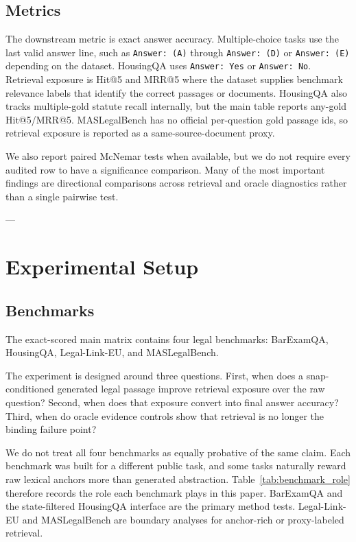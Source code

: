 \subsection{Metrics}

The downstream metric is exact answer accuracy. Multiple-choice tasks use the
last valid answer line, such as \texttt{Answer: (A)} through
\texttt{Answer: (D)} or \texttt{Answer: (E)} depending on the dataset. HousingQA uses
\texttt{Answer: Yes} or \texttt{Answer: No}. Retrieval exposure is Hit@5 and
MRR@5 where the dataset supplies benchmark relevance labels that identify the
correct passages or documents. HousingQA also tracks
multiple-gold statute recall internally, but the main table reports any-gold
Hit@5/MRR@5. MASLegalBench has no official per-question gold passage ids, so
retrieval exposure is reported as a same-source-document proxy.

We also report paired McNemar tests when available, but we do not
require every audited row to have a significance comparison. Many of the most
important findings are directional comparisons across retrieval and oracle
diagnostics rather than a single pairwise test.

---
\section{Experimental Setup}\label{sec:experiment}

\subsection{Benchmarks}

The exact-scored main matrix contains four legal benchmarks:
BarExamQA, HousingQA, Legal-Link-EU, and MASLegalBench.

The experiment is designed around three questions. First, when does a
snap-conditioned generated legal passage improve retrieval exposure over the
raw question? Second, when does that exposure convert into final answer
accuracy? Third, when do oracle evidence controls show that retrieval is no
longer the binding failure point?

We do not treat all four benchmarks as equally probative of the same claim.
Each benchmark was built for a different public task, and some tasks naturally
reward raw lexical anchors more than generated abstraction. Table~\ref{tab:benchmark_role}
therefore records the role each benchmark plays in this paper. BarExamQA and
the state-filtered HousingQA interface are the primary method tests.
Legal-Link-EU and MASLegalBench are boundary analyses for anchor-rich or
proxy-labeled retrieval.

